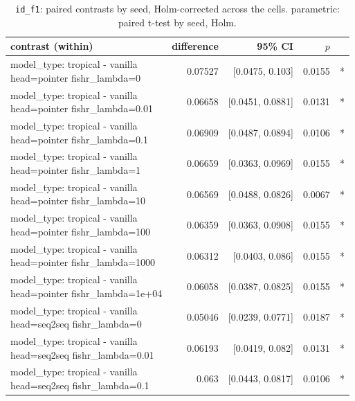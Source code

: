 \documentclass[10pt]{article}
\makeatletter
\newcommand{\stackcell}[1]{\begin{tabular}[t]{@{}l@{}}#1\end{tabular}}
\makeatother
\begin{document}
{\small
\begin{longtable}{lrrrl}
\caption{\texttt{id\_f1}: paired contrasts by seed, Holm-corrected across the cells. parametric: paired t-test by seed, Holm.}\label{tab:paired-id_f1}\\
\toprule
contrast (within) & difference & 95\% CI & $p$ & \\
\midrule
\endhead
\stackcell{model\_type: tropical - vanilla\\\footnotesize head=pointer fishr\_lambda=0 } & 0.07527 & [0.0475, 0.103] & 0.0155 & *\\
\stackcell{model\_type: tropical - vanilla\\\footnotesize head=pointer fishr\_lambda=0.01 } & 0.06658 & [0.0451, 0.0881] & 0.0131 & *\\
\stackcell{model\_type: tropical - vanilla\\\footnotesize head=pointer fishr\_lambda=0.1 } & 0.06909 & [0.0487, 0.0894] & 0.0106 & *\\
\stackcell{model\_type: tropical - vanilla\\\footnotesize head=pointer fishr\_lambda=1 } & 0.06659 & [0.0363, 0.0969] & 0.0155 & *\\
\stackcell{model\_type: tropical - vanilla\\\footnotesize head=pointer fishr\_lambda=10 } & 0.06569 & [0.0488, 0.0826] & 0.0067 & *\\
\stackcell{model\_type: tropical - vanilla\\\footnotesize head=pointer fishr\_lambda=100 } & 0.06359 & [0.0363, 0.0908] & 0.0155 & *\\
\stackcell{model\_type: tropical - vanilla\\\footnotesize head=pointer fishr\_lambda=1000 } & 0.06312 & [0.0403, 0.086] & 0.0155 & *\\
\stackcell{model\_type: tropical - vanilla\\\footnotesize head=pointer fishr\_lambda=1e+04 } & 0.06058 & [0.0387, 0.0825] & 0.0155 & *\\
\stackcell{model\_type: tropical - vanilla\\\footnotesize head=seq2seq fishr\_lambda=0 } & 0.05046 & [0.0239, 0.0771] & 0.0187 & *\\
\stackcell{model\_type: tropical - vanilla\\\footnotesize head=seq2seq fishr\_lambda=0.01 } & 0.06193 & [0.0419, 0.082] & 0.0131 & *\\
\stackcell{model\_type: tropical - vanilla\\\footnotesize head=seq2seq fishr\_lambda=0.1 } & 0.063 & [0.0443, 0.0817] & 0.0106 & *\\

\end{longtable}}
\end{document}

